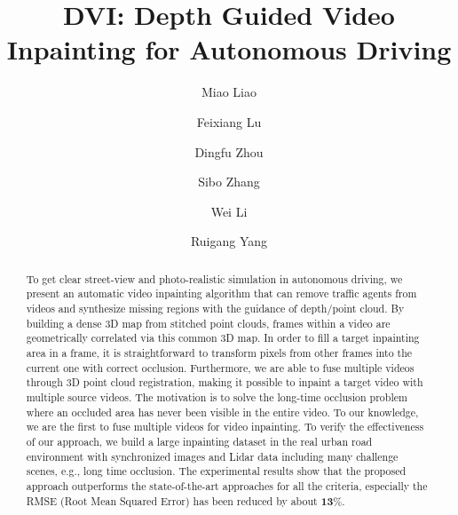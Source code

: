 \documentclass[runningheads]{llncs}
\begin{document}
\pagestyle{headings}
\mainmatter
\def\ECCVSubNumber{100}  

\title{DVI: Depth Guided Video Inpainting for Autonomous Driving} 

\begin{comment}
\titlerunning{ECCV-20 submission ID \ECCVSubNumber} 
\authorrunning{ECCV-20 submission ID \ECCVSubNumber} 
\author{Anonymous ECCV submission}
\institute{Paper ID \ECCVSubNumber}
\end{comment}


\author{Miao Liao \and
Feixiang Lu \and
Dingfu Zhou \and
Sibo Zhang \and
Wei Li \and
Ruigang Yang}
\maketitle

\begin{abstract}
To get clear street-view and photo-realistic simulation in autonomous driving, we present an automatic video inpainting algorithm that can remove traffic agents from videos and synthesize missing regions with the guidance of depth/point cloud. By building a dense 3D map from stitched point clouds, frames within a video are geometrically correlated via this common 3D map. In order to fill a target inpainting area in a frame, it is straightforward to transform pixels from other frames into the current one with correct occlusion. Furthermore, we are able to fuse multiple videos through 3D point cloud registration, making it possible to inpaint a target video with multiple source videos. The motivation is to solve the long-time occlusion problem where an occluded area has never been visible in the entire video. To our knowledge, we are the first to fuse multiple videos for video inpainting. To verify the effectiveness of our approach, we build a large inpainting dataset in the real urban road environment with synchronized images and Lidar data including many challenge scenes, e.g., long time occlusion. The experimental results show that the proposed approach outperforms the state-of-the-art approaches for all the criteria, especially the RMSE (Root Mean Squared Error) has been reduced by about $\textbf{13}\%$.
\end{abstract}
\end{document}
